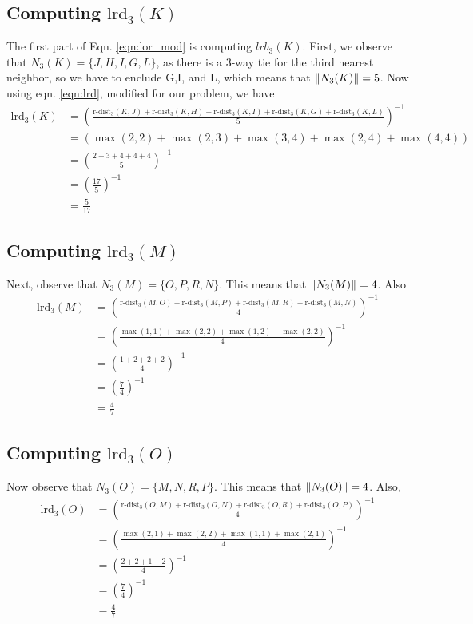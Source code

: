 \documentclass[a4paper,12pt]{article}
\theoremstyle{definition}
\theoremstyle{remark}
\newcommand{\rdist}{\text{r-dist}}
\newcommand{\lrd}{\text{lrd}}
\begin{document}
\subsection*{Computing $\lrd_3(K)$}
The first part of Eqn. \ref{eqn:lor_mod} is computing  $lrb_3(K)$.  First, we observe that $N_3(K) = \{J,H,I,G,L\}$, as there is a 3-way tie for the third nearest neighbor, so we have to enclude G,I, and L, which means that $\norm{N_3(K)} = 5$.  Now using eqn. \ref{eqn:lrd}, modified for our problem, we have
\begin{align*}
	\lrd_3(K) &= \left(\frac{\rdist_3(K,J) + \rdist_3(K,H) + \rdist_3(K,I) + \rdist_3(K,G) + \rdist_3(K,L)}{5}\right)^{-1}\\
	&=\left(\max(2,2) + \max(2,3) + \max(3,4) + \max(2,4) + \max(4,4)\right)\\
	&= \left(\frac{2 + 3 + 4 +4+4}{5}\right)^{-1}\\
	&= \left(\frac{17}{5}\right)^{-1}\\
	&=\frac{5}{17}
\end{align*}

\subsection*{Computing $\lrd_3(M)$}
Next, observe that $N_3(M) = \{O,P,R, N\}$. This means that $\norm{N_3(M)} = 4$. Also
\begin{align*}
	\lrd_3(M) &= \left(\frac{\rdist_3(M,O) + \rdist_3(M,P) + \rdist_3(M,R) + \rdist_3(M,N)}{4}\right)^{-1}\\
	&=\left(\frac{\max(1,1) + \max(2,2) + \max(1,2) + \max(2,2)}{4}\right)^{-1}\\
	&= \left(\frac{1 + 2 + 2 +2}{4}\right)^{-1}\\
	&= \left(\frac{7}{4}\right)^{-1}\\
	&=\frac{4}{7}
\end{align*}


\subsection*{Computing $\lrd_3(O)$}
Now observe that $N_3(O) = \{M,N,R,P\}$. This means that $\norm{N_3(O)} = 4$. Also,
\begin{align*}
	\lrd_3(O) &= \left(\frac{\rdist_3(O,M) + \rdist_3(O,N) + \rdist_3(O,R) + \rdist_3(O,P)}{4}\right)^{-1}\\
	&=\left(\frac{\max(2,1) + \max(2,2) + \max(1,1) + \max(2,1)}{4}\right)^{-1}\\
	&= \left(\frac{2 + 2 + 1 +2}{4}\right)^{-1}\\
	&= \left(\frac{7}{4}\right)^{-1}\\
	&=\frac{4}{7}
\end{align*}
\end{document}
